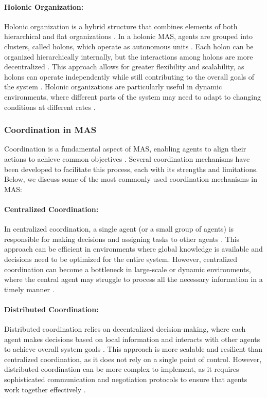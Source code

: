 \paragraph{Holonic Organization:}
Holonic organization is a hybrid structure that combines elements of both hierarchical and flat organizations \cite{durfee1999distributed}. In a holonic MAS, agents are grouped into clusters, called holons, which operate as autonomous units \cite{weiss1999multiagent}. Each holon can be organized hierarchically internally, but the interactions among holons are more decentralized \cite{durfee1999distributed}. This approach allows for greater flexibility and scalability, as holons can operate independently while still contributing to the overall goals of the system \cite{weiss1999multiagent}. Holonic organizations are particularly useful in dynamic environments, where different parts of the system may need to adapt to changing conditions at different rates \cite{durfee1999distributed}.

\subsubsection{Coordination in MAS}

Coordination is a fundamental aspect of MAS, enabling agents to align their actions to achieve common objectives \cite{wooldridge2009introduction}. Several coordination mechanisms have been developed to facilitate this process, each with its strengths and limitations. Below, we discuss some of the most commonly used coordination mechanisms in MAS:

\paragraph{Centralized Coordination:}
In centralized coordination, a single agent (or a small group of agents) is responsible for making decisions and assigning tasks to other agents \cite{jennings1998applications}. This approach can be efficient in environments where global knowledge is available and decisions need to be optimized for the entire system. However, centralized coordination can become a bottleneck in large-scale or dynamic environments, where the central agent may struggle to process all the necessary information in a timely manner \cite{weiss1999multiagent}.

\paragraph{Distributed Coordination:}
Distributed coordination relies on decentralized decision-making, where each agent makes decisions based on local information and interacts with other agents to achieve overall system goals \cite{durfee1999distributed}. This approach is more scalable and resilient than centralized coordination, as it does not rely on a single point of control. However, distributed coordination can be more complex to implement, as it requires sophisticated communication and negotiation protocols to ensure that agents work together effectively \cite{jennings1998applications}.

